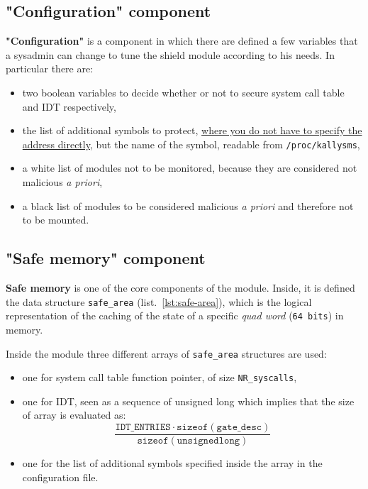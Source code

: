 \documentclass{article}
\begin{document}
	\subsection{"Configuration" component}\label{sec:config}
	\textbf{"Configuration"} is a component in which there are defined a few variables that a sysadmin can change to tune
	the shield module according to his needs. In particular there are:
	\begin{itemize}
		\item two boolean variables to decide whether or not to secure system call table and IDT respectively,
		\item the list of additional symbols to protect, \ul{where you do not have to specify the address
			directly}, but the name of the symbol, readable from \texttt{/proc/kallysms},
		\item a white list of modules not to be monitored, because they are considered not malicious \textit{a priori},
		\item a black list of modules to be considered malicious \textit{a priori} and therefore not to be mounted.
	\end{itemize}

	\subsection{"Safe memory" component}
	\textbf{Safe memory} is one of the core components of the module. Inside, it is defined the data structure \texttt{safe\_area} 
	(list.~\ref{lst:safe-area}), which is the logical representation of the caching of the state of a specific \textit{quad word} 
	(\texttt{64 bits}) in memory.

	Inside the module three different arrays of \texttt{safe\_area} structures are used:
	\begin{itemize}
		\item one for system call table function pointer, of size \texttt{NR\_syscalls},
		\item one for IDT, seen as a sequence of unsigned long which implies that the size of array is evaluated as:
		\begin{equation*}
			\dfrac{\mathtt{IDT\_ENTRIES} \cdot \mathtt{sizeof(gate\_desc)}}{\mathtt{sizeof(unsigned long)}}
		\end{equation*}
		\item one for the list of additional symbols specified inside the array in the configuration file.
	\end{itemize}
\end{document}
